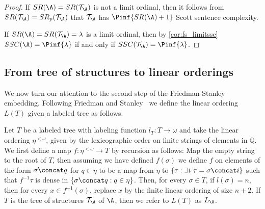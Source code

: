 \documentclass{amsart}
\newcommand{\T}{{\mathcal{T}}}
\newcommand{\SR}{SR}
\begin{document}
\begin{proof}
If $\SR(\A)=\SR(\T_\A)$ is not a limit ordinal, then it follows from
$\SR(\T_\A)=\SR_p(\T_\A)$ that $\T_\A$ has $\Pinf{\SR(\A)+1}$ Scott sentence
complexity.

If $\SR(\A)=\SR(\T_\A)=\lambda$ is a limit ordinal, then by \cref{cor:fs_limitssc}
$SSC(\A)=\Pinf{\lambda}$ if and only if $SSC(\T_\A)=\Pinf{\lambda}$.
\end{proof}


\subsection{From tree of structures to linear orderings}
We now turn our attention to the second step of the Friedman-Stanley embedding.
Following Friedman and Stanley~\cite{friedman1989} we define the linear ordering
$L(T)$ given a labeled tree as follows.
\begin{definition}\label{def:shufflesum}
   Let $T$ be a labeled tree with labeling function $l_T:T\to\omega$ and
   take the linear ordering $\eta^{<\omega}$, given by the lexicographic order
   on finite strings of elements in $\mathbb Q$. We first define a map
   $f:\eta^{<\omega}\to T$ by recursion as follows: Map the empty string to the
   root of $T$, then assuming we have defined $f(\sigma)$ we define $f$ on
   elements of the form $\sigma\concat q$ for $q\in \eta$ to be a map from
   $\eta$ to $\{\tau: \exists i\ \tau=\sigma\concat i\}$ such that
   $f^{-1}{\tau}$ is dense in $\{\sigma\concat q: q\in\eta\}$. Then, for every
   $\sigma\in T$, if $l(\sigma)=n$, then for every $x\in f^{-1}(\sigma)$,
   replace $x$ by the finite linear ordering of size $n+2$.
   If $T$ is the tree of structures $\T_\A$ of $\A$, then we refer to $L(T)$ as
   $L_\A$.
\end{definition}
\end{document}
